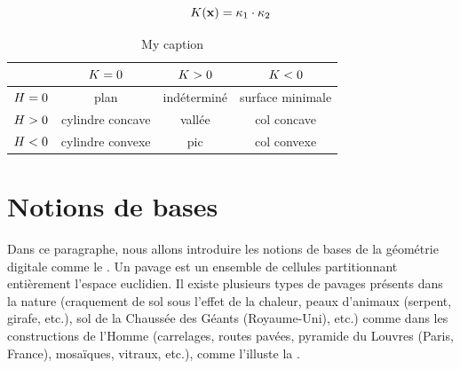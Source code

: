 \begin{equation}
  K(\mathbf{x}) = \kappa_{1} \cdot \kappa_{2}
\end{equation}
%
%
\begin{table}[ht]
\centering
\caption{My caption}
\label{my-label}
\begin{tabular}{@{}lccc@{}}
\toprule
                  & $K = 0$   & $K > 0$   & $K < 0$   \\ \midrule
$H = 0$   & plan               & indéterminé        & surface minimale   \\
$H > 0$   & cylindre concave   & vallée             & col concave        \\
$H < 0$   & cylindre convexe   & pic                & col convexe        \\ \bottomrule
\end{tabular}
\end{table}
%
\section{Notions de bases}
\label{sec:notions-base}
%
Dans ce paragraphe, nous allons introduire les notions de bases de la géométrie
digitale comme le . Un pavage est un ensemble de cellules
partitionnant entièrement l'espace euclidien. Il existe plusieurs types de
pavages présents dans la nature (craquement de sol sous l'effet de la chaleur,
peaux d'animaux (serpent, girafe, etc.), sol de la Chaussée des Géants
(Royaume-Uni), etc.) comme dans les constructions de l'Homme (carrelages, routes
pavées, pyramide du Louvres (Paris, France), mosaïques, vitraux, etc.), comme l'illuste la .


